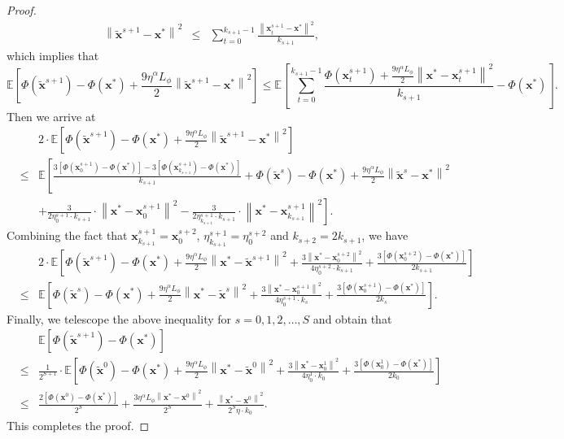 \documentclass[11pt]{article}
\newcommand{\BE}{\mathbb{E}}
\newcommand{\x}{\mathbf x}
\begin{document}
\begin{proof}
\begin{eqnarray*}
\left\| \tilde{\x}^{s+1}-\x^*\right\|^2 & \leq & \sum_{t=0}^{k_{s+1}-1}\frac{\left\| \x_t^{s+1} - \x^*\right\|^2}{k_{s+1}},  
\end{eqnarray*}
which implies that
\begin{equation*}
\BE\left[\Phi(\tilde{\x}^{s+1}) - \Phi(\x^*) + \frac{9 \eta^{\alpha} L_\phi}{2} \left\| \tilde{\x}^{s+1} - \x^*\right\|^2 \right] \leq \BE\left[\sum_{t=0}^{k_{s+1}-1} \frac{\Phi(\x_t^{s+1}) + \frac{9\eta^{\alpha} L_\phi}{2}\left\| \x^* - \x_t^{s+1}\right\|^2}{k_{s+1}} - \Phi(\x^*)\right]. 
\end{equation*}
Then we arrive at 
\begin{eqnarray*}
& & 2 \cdot \BE\left[\Phi(\tilde{\x}^{s+1}) - \Phi(\x^*) + \frac{9\eta^{\alpha} L_\phi}{2} \left\| \tilde{\x}^{s+1} - \x^*\right\|^2 \right]  \\
& \leq & \BE\left[\frac{3\left[\Phi(\x_0^{s+1})-\Phi(\x^*)\right] - 3\left[ \Phi(\x_{k_{s+1}}^{s+1})-\Phi(\x^*)\right]}{k_{s+1}} + \Phi(\tilde{\x}^s) - \Phi(\x^*) + \frac{9\eta^{\alpha} L_\phi}{2}\left\|\tilde{\x}^s - \x^*\right\|^2 \right. \\
& & \left. + \frac{3}{2\eta_0^{s+1} \cdot k_{s+1}}\cdot\left\| \x^* - \x_0^{s+1} \right\|^2 - \frac{3}{2\eta_{k_{s+1}}^{s+1} \cdot k_{s+1}}\cdot\left\| \x^* - \x_{k_{s+1}}^{s+1} \right\|^2 \right]. 
\end{eqnarray*}
Combining the fact that $\x_{k_{s+1}}^{s+1} = \x_0^{s+2}$, $\eta_{k_{s+1}}^{s+1}=\eta_{0}^{s+2}$ and $k_{s+2}=2 k_{s+1}$, we have
\begin{eqnarray*}
& & 2 \cdot \BE\left[\Phi(\tilde{\x}^{s+1}) - \Phi(\x^*) + \frac{9 \eta^{\alpha} L_\phi}{2} \left\| \x^* - \tilde{\x}^{s+1} \right\|^2 + \frac{3\left\| \x^* - \x_0^{s+2} \right\|^2}{4\eta_{0}^{s+2}\cdot k_{s+1}} + \frac{3\left[\Phi(\x_{0}^{s+2})-\Phi(\x^*)\right]}{2 k_{s+1}}\right] \\
& \leq & \BE\left[\Phi(\tilde{\x}^s) - \Phi(\x^*) + \frac{9 \eta^{\alpha}  L_\phi}{2}\left\| \x^* - \tilde{\x}^s \right\|^2 + \frac{3\left\| \x^* - \x_0^{s+1} \right\|^2}{4\eta_0^{s+1} \cdot k_s} + \frac{3\left[\Phi(\x_0^{s+1})-\Phi(\x^*)\right]}{2k_s} \right]. 
\end{eqnarray*}
Finally, we telescope the above inequality for $s=0,1,2,\ldots,S$ and obtain that
\begin{eqnarray*}
& & \BE\left[\Phi(\tilde{\x}^{s+1}) - \Phi(\x^*)\right] \\
& \leq & \frac{1}{2^{S+1}}\cdot\BE\left[\Phi(\tilde{\x}^0) - \Phi(\x^*) + \frac{9 \eta^{\alpha} L_\phi}{2}\left\| \x^* - \tilde{\x}^0 \right\|^2 + \frac{3\left\| \x^* - \x_0^1 \right\|^2}{4 \eta_0^1 \cdot k_0} + \frac{3\left[\Phi(\x_0^1)-\Phi(\x^*)\right]}{2k_0} \right] \\
& \leq & \frac{2\left[\Phi(\x^0)-\Phi(\x^*)\right]}{2^S} + \frac{3 \eta^\alpha L_\phi\left\| \x^* - \x^0 \right\|^2}{2^S} + \frac{\left\| \x^* - \x^0 \right\|^2}{2^S\eta\cdot k_0}. 
\end{eqnarray*}
This completes the proof. 
\end{proof}
\end{document}
